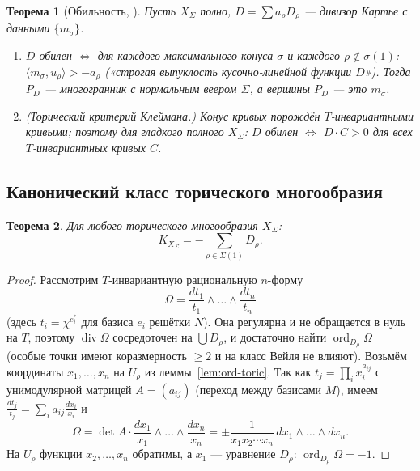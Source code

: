\documentclass[11pt,a4paper]{article}
\theoremstyle{plain}
\newtheorem{theorem}{Теорема}[section]
\theoremstyle{definition}
\theoremstyle{remark}
\DeclareMathOperator{\divv}{div}
\DeclareMathOperator{\ord}{ord}
\begin{document}
\begin{theorem}[{Обильность, \cite[6.1, 6.3]{CLS}}]\label{thm:toric-ample}
Пусть $X_\Sigma$ полно, $D=\sum a_\rho D_\rho$ --- дивизор Картье с данными $\{m_\sigma\}$.
\begin{enumerate}
\item $D$ обилен $\iff$ для каждого максимального конуса $\sigma$ и каждого $\rho\notin\sigma(1)$:
$\langle m_\sigma,u_\rho\rangle>-a_\rho$ («строгая выпуклость кусочно-линейной функции $D$»).
Тогда $P_D$ --- многогранник с нормальным веером $\Sigma$, а вершины $P_D$ --- это $m_\sigma$.
\item (\emph{Торический критерий Клеймана}.) Конус кривых порождён $T$-инвариантными кривыми; поэтому для
гладкого полного $X_\Sigma$: $D$ обилен $\iff$ $D\cdot C>0$ для всех $T$-инвариантных кривых $C$.
\end{enumerate}
\end{theorem}

\subsection{Канонический класс торического многообразия}

\begin{theorem}\label{thm:K-toric}
Для любого торического многообразия $X_\Sigma$:
\[
K_{X_\Sigma}=-\sum_{\rho\in\Sigma(1)}D_\rho .
\]
\end{theorem}
\begin{proof}
Рассмотрим $T$-инвариантную рациональную $n$-форму
\[
\Omega=\frac{dt_1}{t_1}\wedge\dots\wedge\frac{dt_n}{t_n}
\]
(здесь $t_i=\chi^{e_i^*}$ для базиса $e_i$ решётки $N$). Она регулярна и не обращается в нуль на $T$,
поэтому $\divv\Omega$ сосредоточен на $\bigcup D_\rho$, и достаточно найти $\ord_{D_\rho}\Omega$ (особые точки
имеют коразмерность $\ge2$ и на класс Вейля не влияют). Возьмём координаты $x_1,\dots,x_n$ на $U_\rho$
из леммы~\ref{lem:ord-toric}. Так как $t_j=\prod_ix_i^{a_{ij}}$ с унимодулярной матрицей
$A=(a_{ij})$ (переход между базисами $M$), имеем $\frac{dt_j}{t_j}=\sum_ia_{ij}\frac{dx_i}{x_i}$ и
\[
\Omega=\det A\cdot\frac{dx_1}{x_1}\wedge\dots\wedge\frac{dx_n}{x_n}
=\pm\frac{1}{x_1x_2\cdots x_n}\,dx_1\wedge\dots\wedge dx_n .
\]
На $U_\rho$ функции $x_2,\dots,x_n$ обратимы, а $x_1$ --- уравнение $D_\rho$: $\ord_{D_\rho}\Omega=-1$.
\end{proof}
\end{document}
